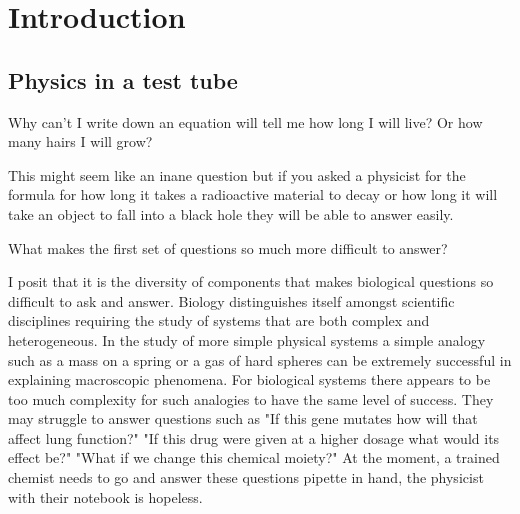 \chapter{Introduction}
\setcounter{page}{1}
\label{chap:intro}

\section{Physics in a test tube}
\chapquote{}{}

\vskip 0.5cm

Why can't I  write down an equation will tell me how long I will live? Or how many hairs I will grow?

This might seem like an inane question but if you asked a physicist for the formula for how long it takes a radioactive material to decay or how long it will take an object to fall into a black hole they will be able to answer easily.

What makes the first set of questions so much more difficult to answer?

I posit that it is the diversity of components that makes biological questions so difficult to ask and answer. Biology distinguishes itself amongst scientific disciplines requiring the study of systems that are both complex and heterogeneous. In the study of more simple physical systems a simple analogy such as a mass on a spring or a gas of hard spheres can be extremely successful in explaining macroscopic phenomena. For biological systems there appears to be too much complexity for such analogies to have the same level of success. They may struggle to answer questions such as "If this gene mutates how will that affect lung function?" "If this drug were given at a higher dosage what would its effect be?" "What if we change this chemical moiety?" At the moment, a trained chemist needs to go and answer these questions pipette in hand, the physicist with their notebook is hopeless.


